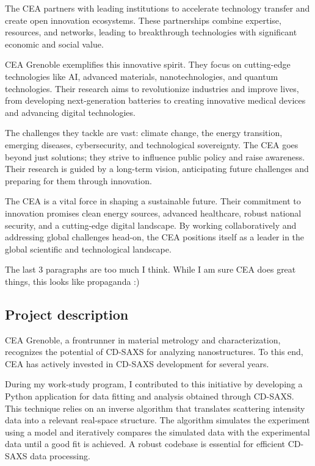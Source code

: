 \medskip

The CEA partners with leading institutions to accelerate technology transfer and create open innovation ecosystems. 
 These partnerships combine expertise, resources, and networks, leading to breakthrough technologies with significant 
 economic and social value.

\medskip

CEA Grenoble exemplifies this innovative spirit. They focus on cutting-edge technologies like AI, advanced materials,
 nanotechnologies, and quantum technologies. Their research aims to revolutionize industries and improve lives, from
 developing next-generation batteries to creating innovative medical devices and advancing digital technologies.

\medskip

The challenges they tackle are vast: climate change, the energy transition, emerging diseases, cybersecurity, and 
technological sovereignty. The CEA goes beyond just solutions; they strive to influence public policy and raise awareness. 
 Their research is guided by a long-term vision, anticipating future challenges and preparing for them through innovation.

\medskip

The CEA is a vital force in shaping a sustainable future. Their commitment to innovation promises clean energy sources, 
advanced healthcare, robust national security, and a cutting-edge digital landscape. By working collaboratively and addressing
 global challenges head-on, the CEA positions itself as a leader in the global scientific and technological landscape.

 \color{red} The last 3 paragraphs are too much I think. While I am sure CEA does great things, this looks like propaganda :) \color{black}
 
\medskip

\subsection{Project description}

\medskip
CEA Grenoble, a frontrunner in material metrology and characterization, recognizes the potential
 of CD-SAXS for analyzing nanostructures. To 
 this end, CEA has actively invested in CD-SAXS development for several years.

\medskip

During my work-study program, I contributed to this initiative by developing a Python application
 for data fitting and analysis obtained through CD-SAXS. This technique relies on an inverse 
 algorithm that translates scattering intensity data into a relevant real-space structure. The 
 algorithm simulates the experiment using a model and iteratively compares the simulated data 
 with the experimental data until a good fit is achieved. A robust codebase is essential for 
 efficient CD-SAXS data processing.

